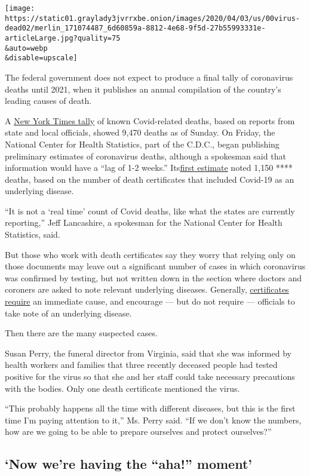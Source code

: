 \texttt{[image: https://static01.graylady3jvrrxbe.onion/images/2020/04/03/us/00virus-dead02/merlin\_171074487\_6d60859a-8812-4e68-9f5d-27b55993331e-articleLarge.jpg?quality=75\\\&auto=webp\\\&disable=upscale]}

The federal government does not expect to produce a final tally of
coronavirus deaths until 2021, when it publishes an annual compilation
of the country's leading causes of death.

A
\href{https://www.nytimes3xbfgragh.onion/interactive/2020/us/coronavirus-us-cases.html}{New
York Times tally} of known Covid-related deaths, based on reports from
state and local officials, showed 9,470 deaths as of Sunday. On Friday,
the National Center for Health Statistics, part of the C.D.C., began
publishing preliminary estimates of coronavirus deaths, although a
spokesman said that information would have a ``lag of 1-2 weeks.''
Its\href{https://www.cdc.gov/nchs/nvss/vsrr/COVID19/}{first estimate}
noted 1,150 **** deaths, based on the number of death certificates that
included Covid-19 as an underlying disease.

``It is not a `real time' count of Covid deaths, like what the states
are currently reporting,'' Jeff Lancashire, a spokesman for the National
Center for Health Statistics, said.

But those who work with death certificates say they worry that relying
only on those documents may leave out a significant number of cases in
which coronavirus was confirmed by testing, but not written down in the
section where doctors and coroners are asked to note relevant underlying
diseases. Generally,
\href{https://www.cdc.gov/nchs/data/dvs/blue_form.pdf}{certificates
require} an immediate cause, and encourage --- but do not require ---
officials to take note of an underlying disease.

Then there are the many suspected cases.

Susan Perry, the funeral director from Virginia, said that she was
informed by health workers and families that three recently deceased
people had tested positive for the virus so that she and her staff could
take necessary precautions with the bodies. Only one death certificate
mentioned the virus.

``This probably happens all the time with different diseases, but this
is the first time I'm paying attention to it,'' Ms. Perry said. ``If we
don't know the numbers, how are we going to be able to prepare ourselves
and protect ourselves?''

\hypertarget{now-were-having-the-aha-moment}{%
\subsection{`Now we're having the ``aha!''
moment'}\label{now-were-having-the-aha-moment}}

